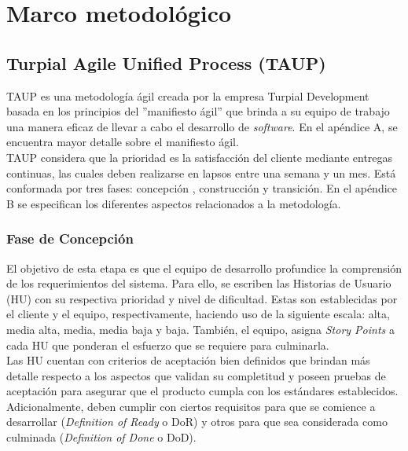 \chapter{\textbf{Marco metodológico}}

\thispagestyle{empty}

\section{Turpial Agile Unified Process (TAUP)}

TAUP es una metodología ágil creada por la empresa Turpial Development basada en los principios del ”manifiesto ágil” que brinda a su equipo de trabajo una manera eficaz de llevar a cabo el desarrollo de \textit{software}. En el apéndice A, se encuentra mayor detalle sobre el manifiesto ágil. \\

TAUP considera que la prioridad es la satisfacción del cliente mediante entregas continuas, las cuales deben realizarse en lapsos entre una semana y un mes. Está conformada por tres fases: concepción , construcción y transición. En el apéndice B se especifican los diferentes aspectos relacionados a la metodología.

\subsection{Fase de Concepción}

El objetivo de esta etapa es que el equipo de desarrollo profundice la comprensión de los requerimientos del sistema. Para ello, se escriben las Historias de Usuario (HU) con su respectiva prioridad y nivel de dificultad. Estas son establecidas por el cliente y el equipo, respectivamente, haciendo uso de la siguiente escala: alta, media alta, media, media baja y baja. También, el equipo, asigna \textit{Story Points} a cada HU que ponderan el esfuerzo que se requiere para culminarla.\\

Las HU cuentan con criterios de aceptación bien definidos que brindan más detalle respecto a los aspectos que validan su completitud y poseen pruebas de aceptación para asegurar que el producto cumpla con los estándares establecidos. Adicionalmente, deben cumplir con ciertos requisitos para que se comience a desarrollar (\textit{Definition of Ready} o DoR) y otros para que sea considerada como culminada (\textit{Definition of Done} o DoD).\\

